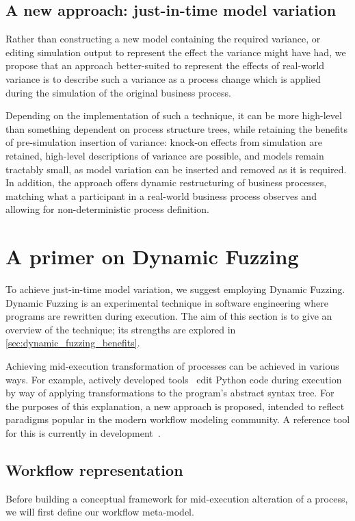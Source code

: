 \documentclass[12pt]{llncs}  %
\begin{document}
\subsection{A new approach: just-in-time model variation}
Rather than constructing a new model containing the required variance, or
editing simulation output to represent the effect the variance might have had,
we propose that an approach better-suited to represent the effects of real-world
variance is to describe such a variance as a process change which is applied
during the simulation of the original business process.
\par

Depending on the implementation of such a technique, it can be more high-level
than something dependent on process structure trees, while retaining the
benefits of pre-simulation insertion of variance: knock-on effects from
simulation are retained, high-level descriptions of variance are possible, and
models remain tractably small, as model variation can be inserted and removed as
it is required. In addition, the approach offers dynamic restructuring of
business processes, matching what a participant in a real-world business process
observes and allowing for non-deterministic process definition.
\par

\section{A primer on Dynamic Fuzzing}
\label{sec:dynamic_fuzzing_explained}
To achieve just-in-time model variation, we suggest employing Dynamic Fuzzing.
Dynamic Fuzzing is an experimental technique in software engineering where programs are rewritten during
execution. The aim of this section is to give an overview of the technique; its
strengths are explored in \cref{sec:dynamic_fuzzing_benefits}.
\par

Achieving mid-execution transformation of processes can be achieved in various
ways. For example, actively developed tools~\citep{pdsf} edit Python code during
execution by way of applying transformations to the program's abstract syntax
tree. For the purposes of this explanation, a new approach is proposed, intended
to reflect paradigms popular in the modern workflow modeling community. A
reference tool for this is currently in development~\citep{workflowgraphs}.

\subsection{Workflow representation}
Before building a conceptual framework for mid-execution alteration of a
process, we will first define our workflow meta-model.
\par
\end{document}
